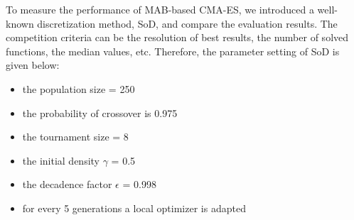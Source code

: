 To measure the performance of MAB-based CMA-ES, we introduced a
well-known discretization method, SoD,  and compare the evaluation
results. The competition criteria can be the resolution of best results,
the number of solved functions, the median values, etc. 
Therefore, the parameter setting of SoD  is given below:
\begin{itemize}
  \item{the population size = 250}
  \item{the probability of crossover is 0.975}
  \item{the tournament size = 8}
  \item{the initial density $\gamma$ = 0.5}
  \item{the decadence factor $\epsilon$ = 0.998}
  \item{for every 5 generations a local optimizer is adapted}
  \end{itemize}


